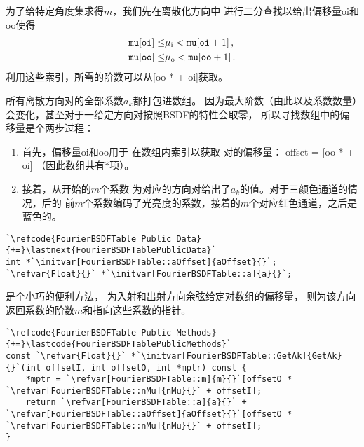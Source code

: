 为了给特定角度集求得$m$，我们先在离散化方向中
进行二分查找以给出偏移量{\ttfamily oi}和{\ttfamily oo}使得
\begin{align*}
    \text{{\ttfamily mu}}[\text{\ttfamily oi}]\le&\mu_{\mathrm{i}}<\text{{\ttfamily mu}}[\text{\ttfamily oi}+1]\, ,\\
    \text{{\ttfamily mu}}[\text{\ttfamily oo}]\le&\mu_{\mathrm{o}}<\text{{\ttfamily mu}}[\text{\ttfamily oo}+1]\, .
\end{align*}
利用这些索引，所需的阶数可以从{\ttfamily{}[oo *  + oi]}获取。

所有离散方向对的全部系数$a_k$都打包进数组。
因为最大阶数（由此以及系数数量）会变化，甚至对于一给定方向对按照BSDF的特性会取零，
所以寻找数组中的偏移量是个两步过程：
\begin{enumerate}
    \item 首先，偏移量{\ttfamily oi}和{\ttfamily oo}用于
    在数组内索引以获取
    对的偏移量：
    {\ttfamily offset = [oo *  + oi]}
    （因此数组共有*项）。
    \item 接着，从开始的$m$个系数
    为对应的方向对给出了$a_k$的值。对于三颜色通道的情况，后的
    前$m$个系数编码了光亮度的系数，接着的$m$个对应红色通道，之后是蓝色的。
\end{enumerate}
\begin{lstlisting}
`\refcode{FourierBSDFTable Public Data}{+=}\lastnext{FourierBSDFTablePublicData}`
int *`\initvar[FourierBSDFTable::aOffset]{aOffset}{}`;
`\refvar{Float}{}` *`\initvar[FourierBSDFTable::a]{a}{}`;
\end{lstlisting}

是个小巧的便利方法，
为入射和出射方向余弦给定对数组的偏移量，
则为该方向返回系数的阶数$m$和指向这些系数的指针。
\begin{lstlisting}
`\refcode{FourierBSDFTable Public Methods}{+=}\lastcode{FourierBSDFTablePublicMethods}`
const `\refvar{Float}{}` *`\initvar[FourierBSDFTable::GetAk]{GetAk}{}`(int offsetI, int offsetO, int *mptr) const {
    *mptr = `\refvar[FourierBSDFTable::m]{m}{}`[offsetO * `\refvar[FourierBSDFTable::nMu]{nMu}{}` + offsetI];
    return `\refvar[FourierBSDFTable::a]{a}{}` + `\refvar[FourierBSDFTable::aOffset]{aOffset}{}`[offsetO * `\refvar[FourierBSDFTable::nMu]{nMu}{}` + offsetI];
}
\end{lstlisting}

